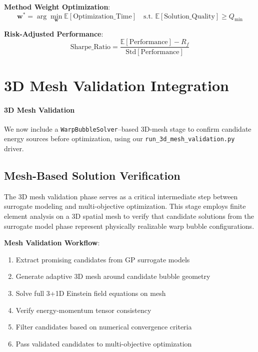 \documentclass[11pt,a4paper]{article}
\begin{document}
\textbf{Method Weight Optimization}:
\begin{equation}
\mathbf{w}^* = \arg\min_{\mathbf{w}} \mathbb{E}[\text{Optimization\_Time}] \quad \text{s.t. } \mathbb{E}[\text{Solution\_Quality}] \geq Q_{\min}
\end{equation}

\textbf{Risk-Adjusted Performance}:
\begin{equation}
\text{Sharpe\_Ratio} = \frac{\mathbb{E}[\text{Performance}] - R_f}{\text{Std}[\text{Performance}]}
\end{equation}

\section{3D Mesh Validation Integration}

\paragraph{3D Mesh Validation} 
We now include a \texttt{WarpBubbleSolver}--based 3D-mesh stage to confirm candidate energy sources before optimization, using our \texttt{run\_3d\_mesh\_validation.py} driver.

\subsection{Mesh-Based Solution Verification}

The 3D mesh validation phase serves as a critical intermediate step between surrogate modeling and multi-objective optimization. This stage employs finite element analysis on a 3D spatial mesh to verify that candidate solutions from the surrogate model phase represent physically realizable warp bubble configurations.

\textbf{Mesh Validation Workflow}:
\begin{enumerate}
\item Extract promising candidates from GP surrogate models
\item Generate adaptive 3D mesh around candidate bubble geometry
\item Solve full 3+1D Einstein field equations on mesh
\item Verify energy-momentum tensor consistency
\item Filter candidates based on numerical convergence criteria
\item Pass validated candidates to multi-objective optimization
\end{enumerate}
\end{document}
